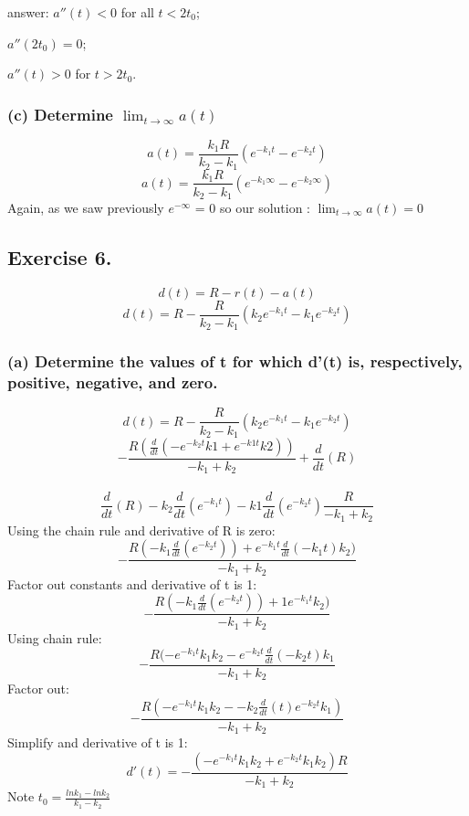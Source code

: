 \documentclass[]{article}
\begin{document}
answer: \(a''(t) < 0\) for all \(t < 2t_0\);

\(a''(2t_0) =0\);

\(a''(t) > 0\) for \(t > 2t_0\).

\subsubsection{\texorpdfstring{(c) Determine
\(\lim_{t\to\infty}a(t)\)}{(c) Determine \textbackslash{}lim\_\{t\textbackslash{}to\textbackslash{}infty\}a(t)}}\label{c-determine-lim_ttoinftyat}

\[a(t) = \frac{k_1 R}{k_2-k_1}(e^{-k_1t} - e^{-k_2t})\]
\[a(t) = \frac{k_1 R}{k_2-k_1}(e^{-k_1 \infty} - e^{-k_2 \infty})\]
Again, as we saw previously \(e^{-\infty}\) = 0 so our solution :
\(\lim_{t\to\infty}a(t) =0\)

\subsection{Exercise 6.}\label{exercise-6.}

\[d(t) = R - r(t) - a(t)\]
\[d(t) = R - \frac{R}{k_2 - k_1}(k_2 e ^{-k_1 t} - k_1 e^{-k_2 t})\]

\subsubsection{(a) Determine the values of t for which d'(t) is,
respectively, positive, negative, and
zero.}\label{a-determine-the-values-of-t-for-which-dt-is-respectively-positive-negative-and-zero.}

\[d(t) = R - \frac{R}{k_2 - k_1}(k_2 e ^{-k_1 t} - k_1 e^{-k_2 t})\]
\[- \frac{R (\frac{d}{dt} (-e^{-k_2 t} k1 + e^{-k1t}k2))}{-k_1 + k_2} + \frac{d}{dt} (R)\]\\
\[\frac{d}{dt}(R) - k_2 \frac{d}{dt}(e^{-k_1 t})-k1\frac{d}{dt}(e^{-k_2 t})\frac{R}{-k_1 + k_2}\]
Using the chain rule and derivative of R is zero:
\[- \frac{R(-k_1 \frac{d}{dt}(e^{-k_2 t})) + e^{-k_1 t}\frac{d}{dt}(-k_1 t)k_2)}{-k_1 + k_2}\]
Factor out constants and derivative of t is 1:
\[- \frac{R(-k_1 \frac{d}{dt}(e^{-k_2 t})) + 1e^{-k_1 t}k_2)}{-k_1 + k_2}\]
Using chain rule:
\[- \frac{R(-e^{-k_1 t}k_1 k_2 - e^{-k_2 t} \frac{d}{dt} (-k_2 t)k_1}{-k_1 + k_2}\]
Factor out:
\[- \frac{R(-e^{-k_1 t}k_1 k_2 - -k_2 \frac{d}{dt}(t)e^{-k_2 t}k_1)}{-k_1 + k_2}\]
Simplify and derivative of t is 1:
\[d'(t) = -\frac{(-e^{-k_1 t}k_1 k_2 + e^{-k_2 t}k_1 k_2)R}{-k_1 + k_2}\]
Note \(t_0 = \frac{ln k_1 - ln k_2}{k_1 - k_2}\)
\end{document}
